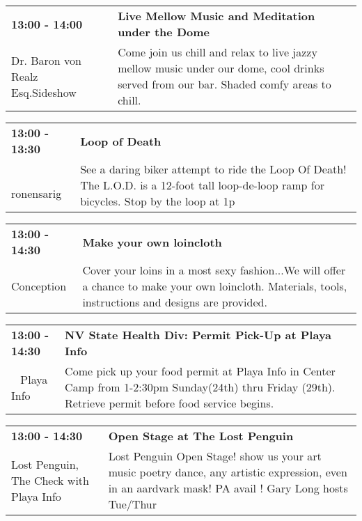 \begin{tabular}{ p{1in} p{2.2in} }
    \textbf{13:00 - 14:00} & \textbf{Live Mellow Music and Meditation under the Dome} \\
    Dr. Baron von Realz Esq.Sideshow \newline  & Come join us chill and relax to live jazzy mellow music under our dome, cool drinks served from our bar. Shaded comfy areas to chill. \\
    \hline 
\end{tabular}
    
\begin{tabular}{ p{1in} p{2.2in} }
    \textbf{13:00 - 13:30} & \textbf{Loop of Death} \\
    ~ \newline ronensarig & See a daring biker attempt to ride the Loop Of Death! The L.O.D. is a 12-foot tall loop-de-loop ramp for bicycles. Stop by the loop at 1p \\
    \hline 
\end{tabular}
    
\begin{tabular}{ p{1in} p{2.2in} }
    \textbf{13:00 - 14:30} & \textbf{Make your own loincloth} \\
    Conception \newline  & Cover your loins in a most sexy fashion...We will offer a chance to make your own loincloth.  Materials, tools, instructions and designs are provided. \\
    \hline 
\end{tabular}
    
\begin{tabular}{ p{1in} p{2.2in} }
    \textbf{13:00 - 14:30} & \textbf{NV State Health Div: Permit Pick-Up at Playa Info} \\
    ~ \newline Playa Info & Come pick up your food permit at Playa Info in Center Camp from 1-2:30pm Sunday(24th) thru Friday (29th). Retrieve permit before food service begins. \\
    \hline 
\end{tabular}
    
\begin{tabular}{ p{1in} p{2.2in} }
    \textbf{13:00 - 14:30} & \textbf{Open Stage at The Lost Penguin} \\
    Lost Penguin, The \newline  Check with Playa Info & Lost Penguin Open Stage! show us your art music poetry dance, any artistic expression, even in an aardvark mask! PA avail !  Gary Long hosts Tue/Thur \\
    \hline 
\end{tabular}
    
